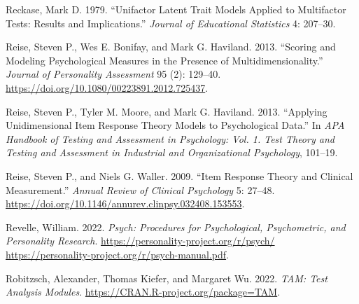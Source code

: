 \documentclass[
  letterpaper,
]{article}
\newlength{\cslhangindent}
\newlength{\cslentryspacingunit} %
\newenvironment{CSLReferences}[2] %
 {%
  \setlength{\parindent}{0pt}
  \ifodd #1
  \let\oldpar\par
  \def\par{\hangindent=\cslhangindent\oldpar}
  \fi
  \setlength{\parskip}{#2\cslentryspacingunit}
 }%
 {}
\begin{document}
\begin{CSLReferences}{1}{0}
\leavevmode{}%
Reckase, Mark D. 1979. {``Unifactor Latent Trait Models Applied to
Multifactor Tests: Results and Implications.''} \emph{Journal of
Educational Statistics} 4: 207--30.

\leavevmode{}%
Reise, Steven P., Wes E. Bonifay, and Mark G. Haviland. 2013. {``Scoring
and Modeling Psychological Measures in the Presence of
Multidimensionality.''} \emph{Journal of Personality Assessment} 95 (2):
129--40. \url{https://doi.org/10.1080/00223891.2012.725437}.

\leavevmode{}%
Reise, Steven P., Tyler M. Moore, and Mark G. Haviland. 2013.
{``Applying Unidimensional Item Response Theory Models to Psychological
Data.''} In \emph{APA Handbook of Testing and Assessment in Psychology:
Vol. 1. Test Theory and Testing and Assessment in Industrial and
Organizational Psychology}, 101--19.

\leavevmode{}%
Reise, Steven P., and Niels G. Waller. 2009. {``Item Response Theory and
Clinical Measurement.''} \emph{Annual Review of Clinical Psychology} 5:
27--48. \url{https://doi.org/10.1146/annurev.clinpsy.032408.153553}.

\leavevmode{}%
Revelle, William. 2022. \emph{Psych: Procedures for Psychological,
Psychometric, and Personality Research}.
\href{https://personality-project.org/r/psych/\%0Ahttps://personality-project.org/r/psych-manual.pdf}{https://personality-project.org/r/psych/
https://personality-project.org/r/psych-manual.pdf}.

\leavevmode{}%
Robitzsch, Alexander, Thomas Kiefer, and Margaret Wu. 2022. \emph{TAM:
Test Analysis Modules}. \url{https://CRAN.R-project.org/package=TAM}.

\end{CSLReferences}
\end{document}
